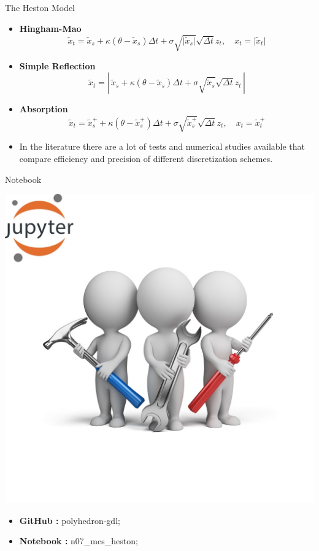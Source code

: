 \documentclass[11pt]{beamer}
\begin{document}
\begin{frame}{The Heston Model}
\begin{itemize}
\item \textbf{Hingham-Mao}
$$\tilde x_t= \tilde x_s   + \kappa(\theta -   \tilde x_s  )\Delta t + \sigma  \sqrt{\vert \tilde x_s \vert} \sqrt{\Delta t} z_t ,\quad x_t = \vert \tilde x_t \vert $$
\item \textbf{Simple Reflection}
$$\tilde x_t= \left\vert \, \tilde x_s   + \kappa(\theta -   \tilde x_s  )\Delta t + \sigma  \sqrt{\tilde x_s} 
\sqrt{\Delta t}  z_t \, \right\vert$$
\item \textbf{Absorption}
$$\tilde x_t=\tilde x_s^+ + \kappa(\theta - \tilde x_s^+)\Delta t + \sigma  \sqrt{\tilde x_s^+} \sqrt{\Delta t} z_t  ,\quad x_t = \tilde x_t^+$$

\item In the literature there are a lot of tests and numerical studies available that compare efficiency and precision of different discretization schemes.
\end{itemize}
\end{frame}
\begin{frame}{Notebook}
\noindent\begin{minipage}{0.5\textwidth}%
\includegraphics[width=\linewidth]{img/exercise.jpg}
\end{minipage}%
\hfill%
\begin{minipage}{0.5\textwidth}
\begin{itemize}
\item {\bf GitHub        : }    polyhedron-gdl;
\item {\bf Notebook   : }    n07\_mcs\_heston;
\end{itemize}
\end{minipage}
\end{frame}
\end{document}
